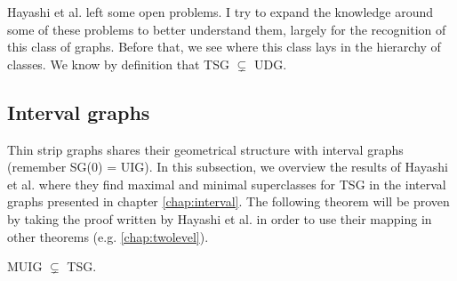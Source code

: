 Hayashi et al. left some open problems. I try to expand the knowledge around some of these problems
to better understand them, largely for the recognition of this class of graphs. Before that, we see where this class lays in the hierarchy of classes. We know by definition that TSG $\subsetneq$ UDG.

\subsection{Interval graphs}

Thin strip graphs shares their geometrical structure with interval graphs (remember SG($0$) = UIG). In this subsection, we overview the results of Hayashi et al. \cite{hayashiThinStripGraphs2017} where they find maximal and minimal superclasses for TSG in the interval graphs presented in chapter \ref{chap:interval}. The following theorem will be proven by taking the proof written by Hayashi et al. in order to use their mapping in other theorems (e.g. \ref{chap:twolevel}).

\begin{theorem}
  \label{theo:muigTSG}
  MUIG $\subsetneq$ TSG.
\end{theorem}

